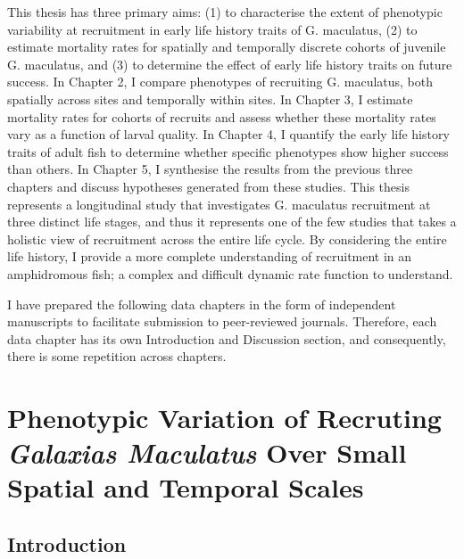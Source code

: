\documentclass[]{book}
\begin{document}
This thesis has three primary aims: (1) to characterise the extent of
phenotypic variability at recruitment in early life history traits of G.
maculatus, (2) to estimate mortality rates for spatially and temporally
discrete cohorts of juvenile G. maculatus, and (3) to determine the
effect of early life history traits on future success. In Chapter 2, I
compare phenotypes of recruiting G. maculatus, both spatially across
sites and temporally within sites. In Chapter 3, I estimate mortality
rates for cohorts of recruits and assess whether these mortality rates
vary as a function of larval quality. In Chapter 4, I quantify the early
life history traits of adult fish to determine whether specific
phenotypes show higher success than others. In Chapter 5, I synthesise
the results from the previous three chapters and discuss hypotheses
generated from these studies. This thesis represents a longitudinal
study that investigates G. maculatus recruitment at three distinct life
stages, and thus it represents one of the few studies that takes a
holistic view of recruitment across the entire life cycle. By
considering the entire life history, I provide a more complete
understanding of recruitment in an amphidromous fish; a complex and
difficult dynamic rate function to understand.

I have prepared the following data chapters in the form of independent
manuscripts to facilitate submission to peer-reviewed journals.
Therefore, each data chapter has its own Introduction and Discussion
section, and consequently, there is some repetition across chapters.

\chapter{\texorpdfstring{Phenotypic Variation of Recruting
\emph{Galaxias Maculatus} Over Small Spatial and Temporal
Scales}{Phenotypic Variation of Recruting Galaxias Maculatus Over Small Spatial and Temporal Scales}}\label{phenotypic-variation-of-recruting-galaxias-maculatus-over-small-spatial-and-temporal-scales}

\section{Introduction}\label{introduction-1}
\end{document}
